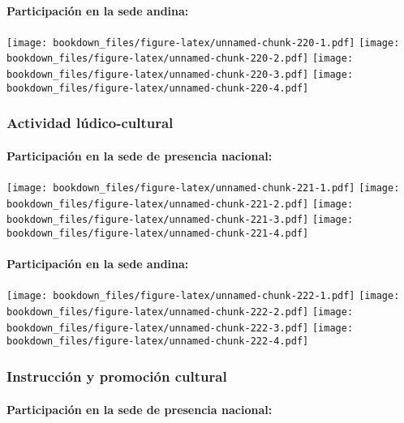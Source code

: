 \documentclass[]{article}
\let\oldparagraph\paragraph
\renewcommand{\paragraph}[1]{\oldparagraph{#1}\mbox{}}
\theoremstyle{definition}
\theoremstyle{definition}
\theoremstyle{definition}
\theoremstyle{remark}
\begin{document}
\paragraph{Participación en la sede
andina:}\label{participacion-en-la-sede-andina-22}

\texttt{[image: bookdown\_files/figure-latex/unnamed-chunk-220-1.pdf]}
\texttt{[image: bookdown\_files/figure-latex/unnamed-chunk-220-2.pdf]}
\texttt{[image: bookdown\_files/figure-latex/unnamed-chunk-220-3.pdf]}
\texttt{[image: bookdown\_files/figure-latex/unnamed-chunk-220-4.pdf]}

\subsubsection{Actividad
lúdico-cultural}\label{actividad-ludico-cultural-1}

\paragraph{Participación en la sede de presencia
nacional:}\label{participacion-en-la-sede-de-presencia-nacional-23}

\texttt{[image: bookdown\_files/figure-latex/unnamed-chunk-221-1.pdf]}
\texttt{[image: bookdown\_files/figure-latex/unnamed-chunk-221-2.pdf]}
\texttt{[image: bookdown\_files/figure-latex/unnamed-chunk-221-3.pdf]}
\texttt{[image: bookdown\_files/figure-latex/unnamed-chunk-221-4.pdf]}

\paragraph{Participación en la sede
andina:}\label{participacion-en-la-sede-andina-23}

\texttt{[image: bookdown\_files/figure-latex/unnamed-chunk-222-1.pdf]}
\texttt{[image: bookdown\_files/figure-latex/unnamed-chunk-222-2.pdf]}
\texttt{[image: bookdown\_files/figure-latex/unnamed-chunk-222-3.pdf]}
\texttt{[image: bookdown\_files/figure-latex/unnamed-chunk-222-4.pdf]}

\subsubsection{Instrucción y promoción
cultural}\label{instruccion-y-promocion-cultural-1}

\paragraph{Participación en la sede de presencia
nacional:}\label{participacion-en-la-sede-de-presencia-nacional-24}
\end{document}

